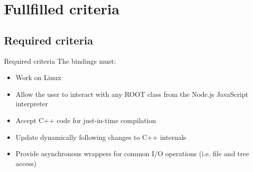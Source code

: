 \section{Fullfilled criteria}

\subsection{Required criteria}
\begin{frame}{Required criteria}
    The bindings must:
     \begin{itemize}
		\item Work on Linux \uncover<2->{\checkmark}
        \item Allow the user to interact with any ROOT class from the Node.js JavaScript interpreter 
        \item Accept C++ code for just-in-time compilation 
        \item Update dynamically following changes to C++ internals 
        \item Provide asynchronous wrappers for common I/O operations (i.e. file and tree access) 
     \end{itemize}
\end{frame}

